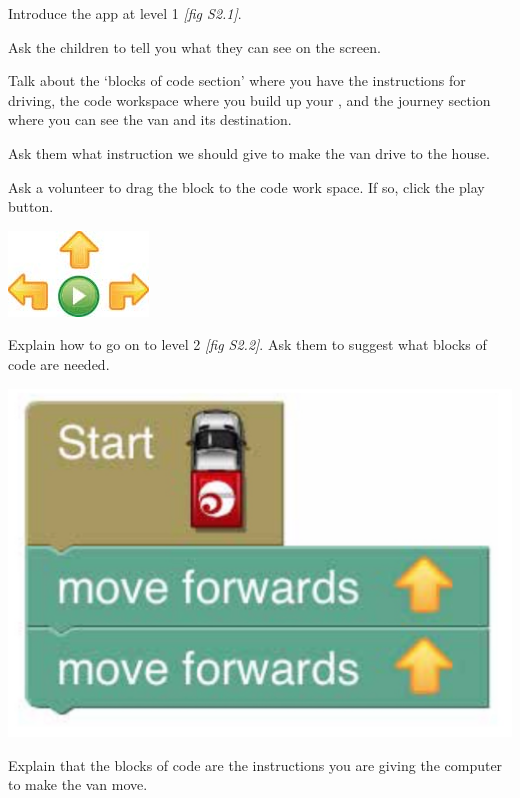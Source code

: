 \documentclass{../../../lessonplan}
\begin{document}
\begin{lessonplan}

Introduce the app at level 1 \textit{[fig S2.1]}.


Ask the children to tell you what they can see on the screen.

Talk about the `blocks of code section' where you have the instructions for driving, the code workspace where you build up your , and the journey section where you can see the van and its destination.


Ask them what instruction we should give to make the van drive to the house.

Ask a volunteer to drag the  block to the code work space.
If so, click the play button.

\begin{center}
\includegraphics[clip,trim=1.7cm 0cm 1.5cm 1.5cm,width=.3\linewidth]{Arrows.jpg}
\end{center}

Explain how to go on to level 2 \textit{[fig S2.2]}.
Ask them to suggest what blocks of code are needed.


\begin{center}
\includegraphics[clip,trim=1.7cm 0cm 1.5cm 1.5cm,width=.667\linewidth]{codeblocks.jpg}
\end{center}

Explain that the blocks of code are the instructions you are giving the computer to make the van move.


\end{lessonplan}
\end{document}
